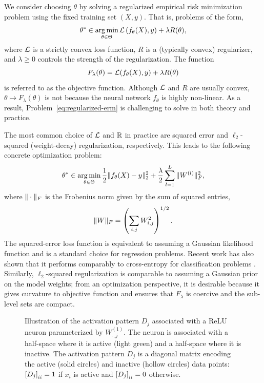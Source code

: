 We consider choosing \( \theta \) by solving a regularized empirical risk
minimization problem using the fixed training set \( (X, y) \).
That is, problems of the form,
\begin{equation}\label{eq:regularized-erm}
    \theta^* \in \mathop{\rm arg\,min}_{\theta \in \Theta}
    \mathcal{L}\left(f_\theta(X), y\right) +
    \lambda R(\theta),
\end{equation}
where \( \mathcal{L} \) is a strictly convex loss function, \( R \) is a (typically
convex) regularizer, and \( \lambda \geq 0 \) controls the strength of the
regularization.
The function
\begin{equation}
    F_\lambda(\theta) = \mathcal{L}(f_\theta(X), y) + \lambda R(\theta)
\end{equation}
is referred to as the objective function.
Although \( \mathcal{L} \) and \( R \) are usually convex, \( \theta \mapsto
F_\lambda(\theta) \) is not because the neural network \( f_\theta \) is
highly non-linear.
As a result, Problem~\ref{eq:regularized-erm} is challenging to solve in both
theory and practice.

The most common choice of \( \mathcal{L} \) and \( \mathbb{R} \) in practice are squared
error and \( \ell_2 \)-squared (weight-decay) regularization, respectively.
This leads to the following concrete optimization problem:
\begin{equation}\label{eq:squared-error}
    \theta^* \in \mathop{\rm arg\,min}_{\theta \in \Theta}
    \frac 1 2 \|f_\theta(X) - y\|_2^2 +
    \frac{\lambda}{2} \sum_{l=1}^L \|W^{(l)}\|_F^2,
\end{equation}
where \( \|\cdot\|_F \) is the Frobenius norm given by the sum of squared entries,
\[
    \|W\|_F = \left(\sum_{i, j} W_{i, j}^2\right)^{1/2}.
\]
The squared-error loss function is equivalent to assuming a Gaussian likelihood
function and is a standard choice for regression problems.
Recent work has also shown that it performs comparably to cross-entropy for
classification problems \citep{hui2021evaluation}.
Similarly, \( \ell_2 \)-squared regularization is comparable to assuming
a Gaussian prior on the model weights;
from an optimization perspective, it is desirable because it gives curvature to
objective function and ensures that \( F_\lambda \) is coercive and the
sub-level sets are compact.

\begin{figure}[t]
    \centering
    
    \caption{Illustration of the activation pattern \( D_j \) associated with a
        ReLU neuron parameterized by \( W^{(1)}_{\cdot, j} \).
        The neuron is associated with a half-space where it
        is active (light green) and a half-space where it is inactive.
        The activation pattern \( D_j \) is a diagonal matrix encoding the
        active (solid circles) and inactive (hollow circles) data points:
        \( \left[D_{j}\right]_{ii} = 1 \) if \( x_i \) is active and
        \( \left[D_{j}\right]_{ii} = 0 \) otherwise.
    }%
    \label{fig:activation-pattern}
\end{figure}

